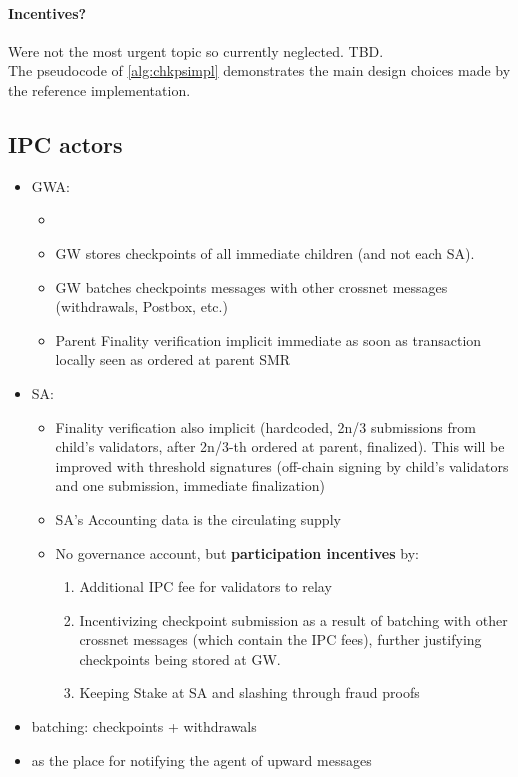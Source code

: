 \paragraph{Incentives?}
Were not the most urgent topic so currently neglected. TBD.\\

The pseudocode of \cref{alg:chkpsimpl} demonstrates the main design choices made by the reference implementation.

\subsection{IPC actors}

\begin{itemize}
\item GWA:
\begin{itemize}
    \item {}
    \item GW stores checkpoints of all immediate children (and not each SA). \texttimes
    \item GW batches checkpoints messages with other crossnet messages (withdrawals, Postbox, etc.) \checkmark
    \item  Parent Finality verification implicit immediate as soon as transaction locally seen as ordered at parent SMR \checkmark{}
\end{itemize}
\item SA:
\begin{itemize}
    \item Finality verification also implicit (hardcoded, 2n/3 submissions from child's validators, after 2n/3-th ordered at parent, finalized). This will be improved with threshold signatures (off-chain signing by child's validators and one submission, immediate finalization)
    \item SA's Accounting data is the circulating supply \checkmark
    \item No governance account, but \textbf{participation incentives} by: 
    \begin{enumerate}
        \item Additional IPC fee for validators to relay
        \item Incentivizing checkpoint submission as a result of batching with other crossnet messages (which contain the IPC fees), further justifying checkpoints being stored at GW.
        \item Keeping Stake at SA and slashing through fraud proofs
    \end{enumerate} 
\end{itemize}
\end{itemize}
\begin{itemize}
    \item batching: checkpoints + withdrawals
    \item \gw as the place for notifying the agent of upward messages
\end{itemize}
